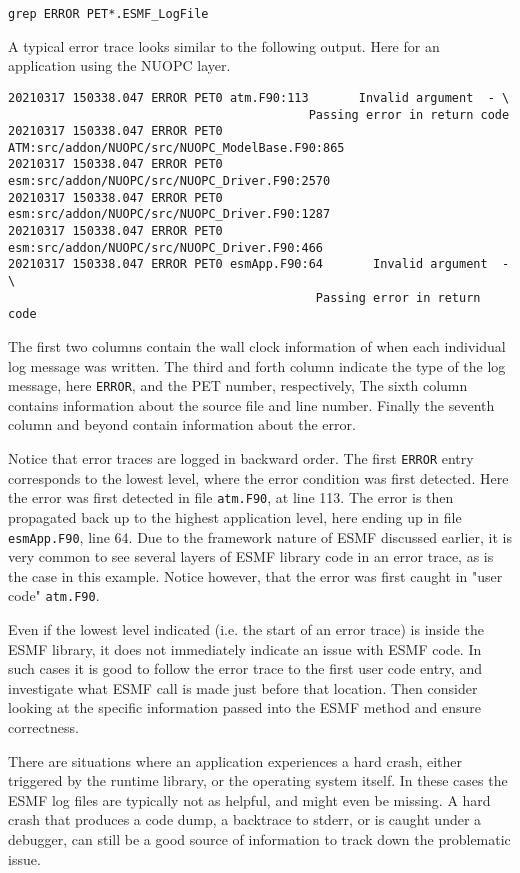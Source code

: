 \begin{verbatim}
grep ERROR PET*.ESMF_LogFile
\end{verbatim}

A typical error trace looks similar to the following output. Here for an
application using the NUOPC layer.

\begin{verbatim}
20210317 150338.047 ERROR PET0 atm.F90:113       Invalid argument  - \
                                          Passing error in return code
20210317 150338.047 ERROR PET0 ATM:src/addon/NUOPC/src/NUOPC_ModelBase.F90:865
20210317 150338.047 ERROR PET0 esm:src/addon/NUOPC/src/NUOPC_Driver.F90:2570
20210317 150338.047 ERROR PET0 esm:src/addon/NUOPC/src/NUOPC_Driver.F90:1287
20210317 150338.047 ERROR PET0 esm:src/addon/NUOPC/src/NUOPC_Driver.F90:466
20210317 150338.047 ERROR PET0 esmApp.F90:64       Invalid argument  - \
                                           Passing error in return code
\end{verbatim}

The first two columns contain the wall clock information of when each individual
log message was written. The third and forth column indicate the type of the log
message, here {\tt ERROR}, and the PET number, respectively, The sixth column
contains information about the source file and line number. Finally the seventh
column and beyond contain information about the error.

Notice that error traces are logged in backward order. The first {\tt ERROR}
entry corresponds to the lowest level, where the error condition was first
detected. Here the error was first detected in file {\tt atm.F90}, at line 113.
The error is then propagated back up to the highest application level,
here ending up in file {\tt esmApp.F90}, line 64. Due to the framework nature
of ESMF discussed earlier, it is very common to see several layers of ESMF
library code in an error trace, as is the case in this example. Notice however,
that the error was first caught in "user code" {\tt atm.F90}.

Even if the lowest level indicated (i.e. the start of an error trace) is inside
the ESMF library, it does not immediately indicate an issue with ESMF code. In
such cases it is good to follow the error trace to the first user code entry,
and investigate what ESMF call is made just before that location.
Then consider looking at the specific information passed into the ESMF method
and ensure correctness.

There are situations where an application experiences a hard crash, either
triggered by the runtime library, or the operating system itself. In these cases
the ESMF log files are typically not as helpful, and might even be missing. A
hard crash that produces a code dump, a backtrace to stderr, or is caught under
a debugger, can still be a good source of information to track down the 
problematic issue.

